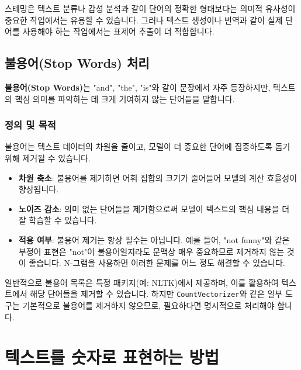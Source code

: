 \documentclass[11pt,a4paper]{article}
\begin{document}
\begin{warningbox}
스테밍은 텍스트 분류나 감성 분석과 같이 단어의 정확한 형태보다는 의미적 유사성이 중요한 작업에서는 유용할 수 있습니다. 그러나 텍스트 생성이나 번역과 같이 실제 단어를 사용해야 하는 작업에서는 표제어 추출이 더 적합합니다.
\end{warningbox}

\subsection{불용어(Stop Words) 처리}

\begin{conceptbox}
\textbf{불용어(Stop Words)}는 "and", "the", "is"와 같이 문장에서 자주 등장하지만, 텍스트의 핵심 의미를 파악하는 데 크게 기여하지 않는 단어들을 말합니다.
\end{conceptbox}

\subsubsection{정의 및 목적}
불용어는 텍스트 데이터의 차원을 줄이고, 모델이 더 중요한 단어에 집중하도록 돕기 위해 제거될 수 있습니다.

\begin{itemize}
    \item \textbf{차원 축소}: 불용어를 제거하면 어휘 집합의 크기가 줄어들어 모델의 계산 효율성이 향상됩니다.
    \item \textbf{노이즈 감소}: 의미 없는 단어들을 제거함으로써 모델이 텍스트의 핵심 내용을 더 잘 학습할 수 있습니다.
    \item \textbf{적용 여부}: 불용어 제거는 항상 필수는 아닙니다. 예를 들어, "not funny"와 같은 부정어 표현은 "not"이 불용어일지라도 문맥상 매우 중요하므로 제거하지 않는 것이 좋습니다. N-그램을 사용하면 이러한 문제를 어느 정도 해결할 수 있습니다.
\end{itemize}

\begin{examplebox}
일반적으로 불용어 목록은 특정 패키지(예: NLTK)에서 제공하며, 이를 활용하여 텍스트에서 해당 단어들을 제거할 수 있습니다. 하지만 \texttt{CountVectorizer}와 같은 일부 도구는 기본적으로 불용어를 제거하지 않으므로, 필요하다면 명시적으로 처리해야 합니다.
\end{examplebox}

\newpage
\section{텍스트를 숫자로 표현하는 방법}
\end{document}
